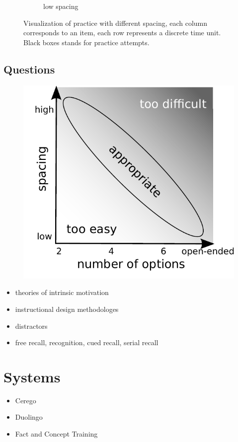 \documentclass[table,color]{fithesis3/fithesis3}
\begin{document}
\begin{figure}
\begin{subfigure}[b]{.5\textwidth}
		\caption{low spacing}
		\label{figure:practice_progress_b}
	\end{subfigure}
	\caption{Visualization of practice with different spacing, each column
		corresponds to an item, each row represents a discrete time unit. Black
		boxes stands for practice attempts.}
	\label{figure:practice_progress}
\end{figure}

\subsection{Questions}
\begin{figure}
	\begin{center}
		\includegraphics[width=.5\textwidth]{figure/options_vs_spacing}
	\end{center}
\end{figure}

\begin{itemize}
	\item theories of intrinsic motivation~\cite{habgood2011motivating}
	\item instructional design methodologes~\cite{luckin2001designing}
	\item distractors~\cite{little2015optimizing}
	\item free recall, recognition, cued recall, serial recall
\end{itemize}

\section{Systems}

\begin{itemize}
	\item Cerego
	\item Duolingo~\cite{von2013duolingo, garcia2013learning}
	\item Fact and Concept Training~\cite{pavlik2007fact,pavlik2008using}
\end{itemize}
\end{document}
